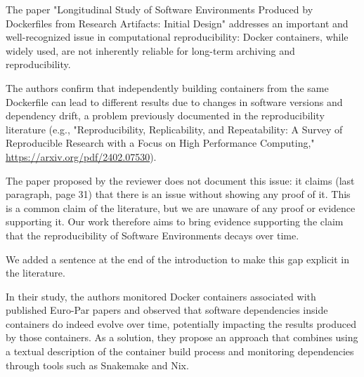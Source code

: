 \documentclass[%
	11pt,
	final,
]{article}
\begin{document}
The paper "Longitudinal Study of Software Environments Produced by Dockerfiles from Research Artifacts: Initial Design" addresses an important and well-recognized issue in computational reproducibility: Docker containers, while widely used, are not inherently reliable for long-term archiving and reproducibility. 

The authors confirm that independently building containers from the same Dockerfile can lead to different results due to changes in software versions and dependency drift, a problem previously documented in the reproducibility literature (e.g., "Reproducibility, Replicability, and Repeatability: A Survey of Reproducible Research with a Focus on High Performance Computing," \url{https://arxiv.org/pdf/2402.07530}).

\begin{review-answer}
The paper proposed by the reviewer does not document this issue: it claims (last paragraph, page 31) that there is an issue without showing any proof of it.
This is a common claim of the literature, but we are unaware of any proof or evidence supporting it. %
Our work therefore aims to bring evidence supporting the claim that the reproducibility of Software Environments decays over time.

We added a sentence at the end of the introduction to make this gap explicit in the literature.
\end{review-answer}

In their study, the authors monitored Docker containers associated with published Euro-Par papers and observed that software dependencies inside containers do indeed evolve over time, potentially impacting the results produced by those containers.
As a solution, they propose an approach that combines using a textual description of the container build process and monitoring dependencies through tools such as Snakemake and Nix.
\end{document}

